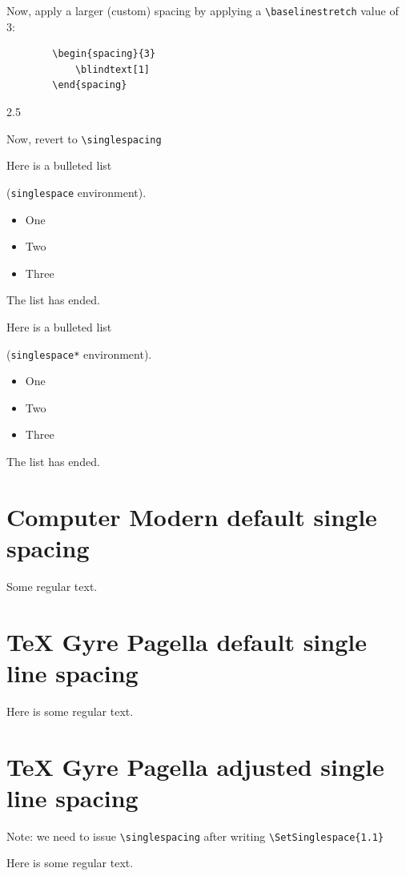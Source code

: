 \documentclass{article}
\begin{document}
	\blindtext[1]
	
	Now, apply a larger (custom) spacing by applying a \verb|\baselinestretch| value of 3:
	
	\begin{verbatim}
		\begin{spacing}{3}
			\blindtext[1]
		\end{spacing}
	\end{verbatim}
	
	\begin{spacing}{2.5}
		\blindtext[1]
	\end{spacing}
	Now, revert to \verb|\singlespacing|\singlespacing\blindtext[1]
	\doublespacing 
	\blindtext[1]
	
	\begin{minipage}{.4\textwidth}
		\begin{singlespace}
			Here is a bulleted list\par (\texttt{singlespace} environment).
			\begin{itemize}
				\item One
				\item Two
				\item Three
			\end{itemize}
		\end{singlespace}%
		The list has ended.
	\end{minipage}\kern10pt%
	\begin{minipage}{.4\textwidth}
		\begin{singlespace*}
			Here is a bulleted list\par (\texttt{singlespace*} environment).
			\begin{itemize}
				\item One
				\item Two
				\item Three
			\end{itemize}
		\end{singlespace*}
		The list has ended.
	\end{minipage}
	
	\section*{Computer Modern default single spacing}
	Some regular text. \blindtext[1]
	\setmainfont{TeX Gyre Pagella}
	\section*{TeX Gyre Pagella default single line spacing}
	Here is some regular text. \blindtext[1]
	\section*{TeX Gyre Pagella adjusted single line spacing}
	Note: we need to issue \verb|\singlespacing| after writing  
	\verb|\SetSinglespace{1.1}|\singlespacing
	\begin{singlespace*} 
		Here is some regular text. \blindtext[1]
	\end{singlespace*}
\end{document}
